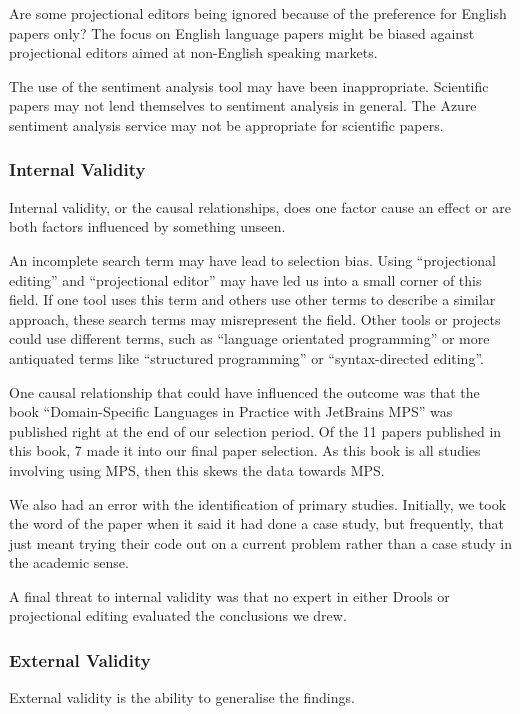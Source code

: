 Are some projectional editors being ignored because of the preference for English papers only?
The focus on English language papers might be biased against projectional editors aimed at non-English speaking markets.

The use of the sentiment analysis tool may have been inappropriate.
Scientific papers may not lend themselves to sentiment analysis in general.
The Azure sentiment analysis service may not be appropriate for scientific papers.

\subsubsection{Internal Validity}
Internal validity, or the causal relationships, does one factor cause an effect or are both factors influenced by something unseen.

An incomplete search term may have lead to selection bias.  
Using ``projectional editing'' and ``projectional editor'' may have led us into a small corner of this field.
If one tool uses this term and others use other terms to describe a similar approach, these search terms may misrepresent the field.
Other tools or projects could use different terms, such as ``language orientated programming'' or more antiquated terms like ``structured programming'' or ``syntax-directed editing''.

One causal relationship that could have influenced the outcome was that the book ``Domain-Specific Languages in Practice with JetBrains MPS'' was published right at the end of our selection period.
Of the 11 papers published in this book, 7 made it into our final paper selection.
As this book is all studies involving using MPS, then this skews the data towards MPS.

We also had an error with the identification of primary studies. 
Initially, we took the word of the paper when it said it had done a case study, but frequently, that just meant trying their code out on a current problem rather than a case study in the academic sense.

A final threat to internal validity was that no expert in either Drools or projectional editing evaluated the conclusions we drew.

\subsubsection{External Validity}
External validity is the ability to generalise the findings.


